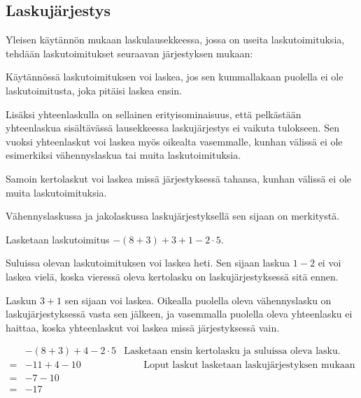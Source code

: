 \subsection*{Laskujärjestys}

Yleisen käytännön mukaan laskulausekkeessa, jossa on useita laskutoimituksia, tehdään laskutoimitukset seuraavan järjestyksen mukaan:


Käytännössä laskutoimituksen voi laskea, jos sen kummallakaan puolella ei ole laskutoimitusta, joka pitäisi laskea ensin.

Lisäksi yhteenlaskulla on sellainen erityisominaisuus, että pelkästään yhteenlaskua sisältävässä
lausekkeessa laskujärjestys ei vaikuta tulokseen. Sen vuoksi yhteenlaskut voi laskea myös oikealta
vasemmalle, kunhan välissä ei ole esimerkiksi vähennyslaskua tai muita laskutoimituksia.

Samoin kertolaskut voi laskea missä järjestyksessä tahansa, kunhan välissä ei ole muita laskutoimituksia.

Vähennyslaskussa ja jakolaskussa laskujärjestyksellä sen sijaan on merkitystä.

\begin{esimerkki}
Lasketaan laskutoimitus $-(8+3)+3+1-2\cdot 5$.

Suluissa olevan laskutoimituksen voi laskea heti. Sen sijaan laskua $1-2$ ei voi laskea vielä,
koska vieressä oleva kertolasku on laskujärjestyksessä sitä ennen. %

Laskun $3+1$ sen sijaan voi laskea. Oikealla puolella oleva vähennyslasku on
laskujärjestyksessä vasta sen jälkeen, ja vasemmalla puolella oleva yhteenlasku ei haittaa,
koska yhteenlaskut voi laskea missä järjestyksessä vain.

\begin{align*}
   &-(8+3)+4-2\cdot 5&\textrm{Lasketaan ensin kertolasku ja suluissa oleva lasku.}
\\=&-11+4-10&\qquad\textrm{Loput laskut lasketaan laskujärjestyksen mukaan vasemmalta oikealle.}
\\=&-7-10&
\\=&-17&
\end{align*}
\end{esimerkki}

